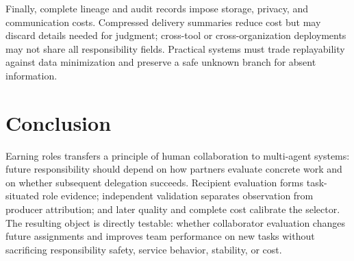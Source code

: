 \documentclass[sigconf,anonymous]{aamas}
\begin{document}
Finally, complete lineage and audit records impose storage, privacy, and communication costs. Compressed delivery summaries reduce cost but may discard details needed for judgment; cross-tool or cross-organization deployments may not share all responsibility fields. Practical systems must trade replayability against data minimization and preserve a safe unknown branch for absent information.

\section{Conclusion}
Earning roles transfers a principle of human collaboration to multi-agent systems: future responsibility should depend on how partners evaluate concrete work and on whether subsequent delegation succeeds. Recipient evaluation forms task-situated role evidence; independent validation separates observation from producer attribution; and later quality and complete cost calibrate the selector. The resulting object is directly testable: whether collaborator evaluation changes future assignments and improves team performance on new tasks without sacrificing responsibility safety, service behavior, stability, or cost.

\balance
\clearpage


\end{document}
